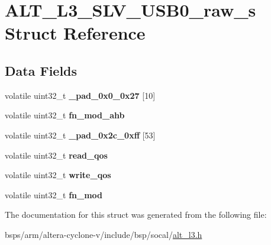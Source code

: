 \hypertarget{structALT__L3__SLV__USB0__raw__s}{}\section{A\+L\+T\+\_\+\+L3\+\_\+\+S\+L\+V\+\_\+\+U\+S\+B0\+\_\+raw\+\_\+s Struct Reference}
\label{structALT__L3__SLV__USB0__raw__s}
\subsection*{Data Fields}
\begin{DoxyCompactItemize}
\item 
\mbox{\label{structALT__L3__SLV__USB0__raw__s_ae124043a6c4a1f09814381de78c02ef2}} 
volatile uint32\+\_\+t {\bfseries \+\_\+pad\+\_\+0x0\+\_\+0x27} \mbox{[}10\mbox{]}
\item 
\mbox{\label{structALT__L3__SLV__USB0__raw__s_a5d7285053af3434f00c5e46c681c1025}} 
volatile uint32\+\_\+t {\bfseries fn\+\_\+mod\+\_\+ahb}
\item 
\mbox{\label{structALT__L3__SLV__USB0__raw__s_a3eab80bbd6f659d9d22c9fad523767d4}} 
volatile uint32\+\_\+t {\bfseries \+\_\+pad\+\_\+0x2c\+\_\+0xff} \mbox{[}53\mbox{]}
\item 
\mbox{\label{structALT__L3__SLV__USB0__raw__s_a7df08772892354e2a3f20c19e530fa45}} 
volatile uint32\+\_\+t {\bfseries read\+\_\+qos}
\item 
\mbox{\label{structALT__L3__SLV__USB0__raw__s_a7eb10761b5ac3f75be73b7c0f1af87ca}} 
volatile uint32\+\_\+t {\bfseries write\+\_\+qos}
\item 
\mbox{\label{structALT__L3__SLV__USB0__raw__s_a34f9880780ffbfc435a201f28ca18e8b}} 
volatile uint32\+\_\+t {\bfseries fn\+\_\+mod}
\end{DoxyCompactItemize}


The documentation for this struct was generated from the following file\+:\begin{DoxyCompactItemize}
\item 
bsps/arm/altera-\/cyclone-\/v/include/bsp/socal/\mbox{\hyperlink{alt__l3_8h}{alt\+\_\+l3.\+h}}\end{DoxyCompactItemize}

